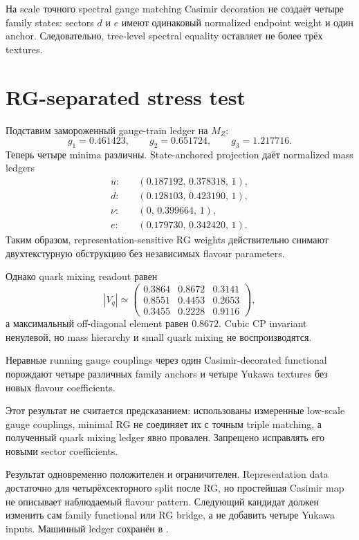 \begin{theorem}
На scale точного spectral gauge matching Casimir decoration не создаёт четыре
family states: sectors \(d\) и \(e\) имеют одинаковый normalized endpoint
weight и один anchor. Следовательно, tree-level spectral equality оставляет
не более трёх textures.
\end{theorem}

\section{RG-separated stress test}

Подставим замороженный gauge-train ledger на \(M_Z\):
\begin{equation}
 g_1=0.461423,
 \qquad g_2=0.651724,
 \qquad g_3=1.217716.
\end{equation}
Теперь четыре minima различны. State-anchored projection даёт normalized
mass ledgers
\begin{align}
 u:&\quad(0.187192,\,0.378318,\,1),\\
 d:&\quad(0.128103,\,0.423190,\,1),\\
 \nu:&\quad(0,\,0.399664,\,1),\\
 e:&\quad(0.179730,\,0.342420,\,1).
\end{align}
Таким образом, representation-sensitive RG weights действительно снимают
двухтекстурную обструкцию без независимых flavour parameters.

Однако quark mixing readout равен
\begin{equation}
 |V_q|\simeq
 \begin{pmatrix}
 0.3864&0.8672&0.3141\\
 0.8551&0.4453&0.2653\\
 0.3455&0.2228&0.9116
 \end{pmatrix},
\end{equation}
а максимальный off-diagonal element равен \(0.8672\). Cubic CP invariant
ненулевой, но mass hierarchy и small quark mixing не воспроизводятся.

\begin{theorem}
Неравные running gauge couplings через один Casimir-decorated functional
порождают четыре различных family anchors и четыре Yukawa textures без новых
flavour coefficients.
\end{theorem}

\begin{nogocriterion}
Этот результат не считается предсказанием: использованы измеренные low-scale
gauge couplings, minimal RG не соединяет их с точным triple matching, а
полученный quark mixing ledger явно провален. Запрещено исправлять его новыми
sector coefficients.
\end{nogocriterion}

Результат одновременно положителен и ограничителен. Representation data
достаточно для четырёхсекторного split после RG, но простейшая Casimir map не
описывает наблюдаемый flavour pattern. Следующий кандидат должен изменить
сам family functional или RG bridge, а не добавить четыре Yukawa inputs.
Машинный ledger сохранён в
.